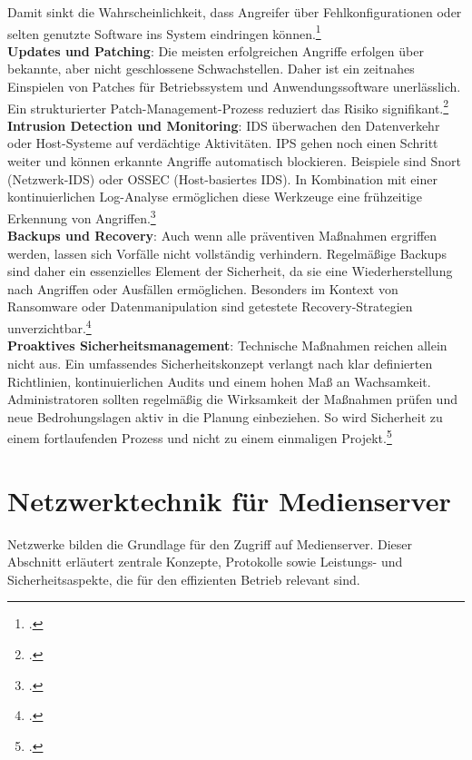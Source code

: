 \documentclass[12pt,a4paper]{report}
\begin{document}
  Damit sinkt die Wahrscheinlichkeit, dass Angreifer über Fehlkonfigurationen oder selten genutzte Software ins System eindringen können.\footcite[Vgl.][S.~902]{nemeth_unixlinux}
  \\  
  \newline
  \textbf{Updates und Patching}:  
  Die meisten erfolgreichen Angriffe erfolgen über bekannte, aber nicht geschlossene Schwachstellen. 
  Daher ist ein zeitnahes Einspielen von Patches für Betriebssystem und Anwendungssoftware unerlässlich. 
  Ein strukturierter Patch-Management-Prozess reduziert das Risiko signifikant.\footcite[Vgl.][S.~901]{nemeth_unixlinux}  
  \\
  \newline
  \textbf{Intrusion Detection und Monitoring}:  
  \ac{IDS} überwachen den Datenverkehr oder Host-Systeme auf verdächtige Aktivitäten. 
  \ac{IPS} gehen noch einen Schritt weiter und können erkannte Angriffe automatisch blockieren. 
  Beispiele sind Snort (Netzwerk-\ac{IDS}) oder OSSEC (Host-basiertes \ac{IDS}). 
  In Kombination mit einer kontinuierlichen Log-Analyse ermöglichen diese Werkzeuge eine frühzeitige Erkennung von Angriffen.\footcite[Vgl.][S.~918~ff.]{nemeth_unixlinux} 
  \\ 
  \newline
  \textbf{Backups und Recovery}:  
  Auch wenn alle präventiven Maßnahmen ergriffen werden, lassen sich Vorfälle nicht vollständig verhindern. 
  Regelmäßige Backups sind daher ein essenzielles Element der Sicherheit, da sie eine Wiederherstellung nach Angriffen oder Ausfällen ermöglichen. 
  Besonders im Kontext von Ransomware oder Datenmanipulation sind getestete Recovery-Strategien unverzichtbar.\footcite[Vgl.][S.~903]{nemeth_unixlinux} 
  \\ 
  \newline
  \textbf{Proaktives Sicherheitsmanagement}:  
  Technische Maßnahmen reichen allein nicht aus. 
  Ein umfassendes Sicherheitskonzept verlangt nach klar definierten Richtlinien, kontinuierlichen Audits und einem hohen Maß an Wachsamkeit. 
  Administratoren sollten regelmäßig die Wirksamkeit der Maßnahmen prüfen und neue Bedrohungslagen aktiv in die Planung einbeziehen. 
  So wird Sicherheit zu einem fortlaufenden Prozess und nicht zu einem einmaligen Projekt.\footcite[Vgl.][S.~901, S.~905]{nemeth_unixlinux}   

\section{Netzwerktechnik für Medienserver}
Netzwerke bilden die Grundlage für den Zugriff auf Medienserver. 
Dieser Abschnitt erläutert zentrale Konzepte, Protokolle sowie Leistungs- und Sicherheitsaspekte, 
die für den effizienten Betrieb relevant sind.  
\end{document}
